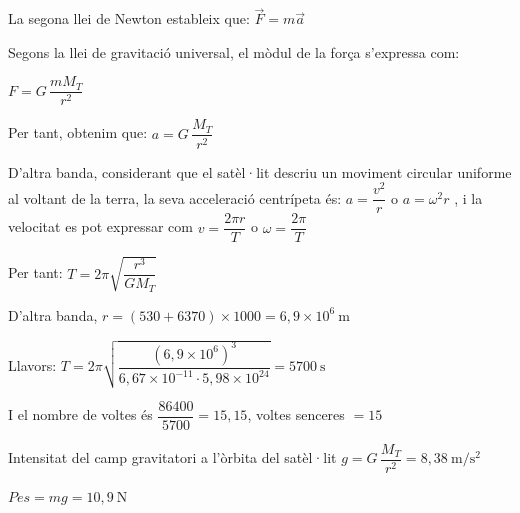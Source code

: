 \begin{solapartat}
La segona llei de Newton estableix que: $\vec{F} = m\vec{a}$ \quad{}

Segons la llei de gravitació universal, el mòdul de la força s'expressa com:

$F = G\,\dfrac{mM_T}{r^2}$ \quad{}

Per tant, obtenim que: $a = G\,\dfrac{M_T}{r^2}$ \quad{}

D'altra banda, considerant que el satèl·lit descriu un moviment circular uniforme al voltant de la terra, la seva acceleració centrípeta és: $a = \dfrac{v^2}{r}$ o $a = \omega^2 r$ \unskip, i la velocitat es pot expressar com $v = \dfrac{2\pi r}{T}$ o $\omega = \dfrac{2\pi}{T}$ \quad{}

Per tant: $T = 2\pi\sqrt{\dfrac{r^3}{GM_T}}$ \quad{}

D'altra banda, $r = (530 + 6370)\times 1000 = 6,9\times 10^{6}\ \mathrm{m}$ \quad{}

Llavors: $T = 2\pi\sqrt{\dfrac{(6,9\times 10^{6})^3}{6,67\times 10^{-11}\cdot 5,98\times 10^{24}}} = 5700\ \mathrm{s}$ \quad{}

I el nombre de voltes és $\dfrac{86400}{5700} = 15,15$, voltes senceres $= 15$ \quad{}
\end{solapartat}

\begin{solapartat}
Intensitat del camp gravitatori a l'òrbita del satèl·lit $g = G\,\dfrac{M_T}{r^2} = 8,38\ \mathrm{m/s^2}$ \quad{}

$\mathit{Pes} = mg = 10,9\ \mathrm{N}$ \quad{}
\end{solapartat}
